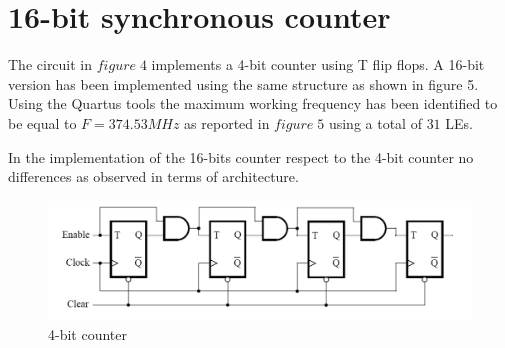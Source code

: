 \documentclass[12pt]{article}
\begin{document}
\section{16-bit synchronous counter}

The circuit in $figure\;4$ implements a 4-bit counter using T flip flops. A 16-bit version has been implemented using the same structure as shown in figure 5. Using the Quartus tools the maximum working frequency has been identified to be equal to $F=374.53MHz$ as reported in $figure\;5$ using a total of $31$ LEs.

 In the implementation of the 16-bits counter respect to the 4-bit counter no differences as observed in terms of architecture.




\vspace{10mm}
\begin{figure}[h]
	\centering
	\includegraphics[scale = 0.8]{immagini/count.PNG}
	\caption{4-bit counter}
\end{figure}
\end{document}
